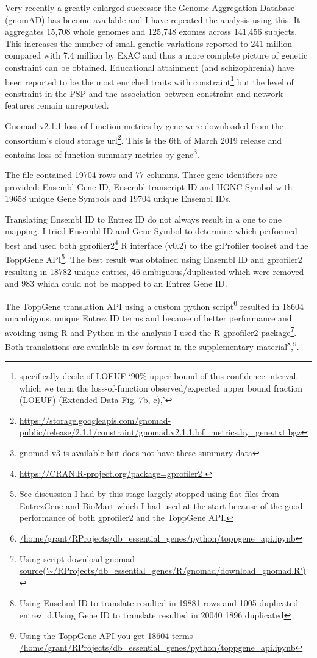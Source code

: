 Very recently a greatly enlarged successor the Genome Aggregation Database (gnomAD) has become available and I have repeated the analysis using this. It aggregates 15,708 whole genomes and 125,748 exomes across 141,456 subjects. This increases the number of small genetic variations reported to 241 million compared with 7.4 million by ExAC and thus a more complete picture of genetic constraint can be obtained\cite{karczewski2020mutational}. Educational attainment (and schizophrenia) have been reported to be the most enriched traits with constraint\cite{karczewski2020mutational}\footnote{specifically decile of LOEUF `90\% upper bound of this confidence interval, which we term the loss-of-function observed/expected upper bound fraction (LOEUF) (Extended Data Fig. 7b, c),\cite{karczewski2020mutational}'} but the level of constraint in the PSP and the association between constraint and network features remain unreported.  

Gnomad v2.1.1 loss of function metrics by gene were downloaded from the consortium's cloud storage url\footnote{\url{https://storage.googleapis.com/gnomad-public/release/2.1.1/constraint/gnomad.v2.1.1.lof_metrics.by_gene.txt.bgz}}. This is the 6th of March 2019 release and contains loss of function summary metrics by gene\footnote{gnomad v3 is available but does not have these summary data}.

The file contained 19704 rows and 77 columns. Three gene identifiers are provided: Ensembl Gene ID, Ensembl transcript ID and HGNC Symbol with 19658 unique Gene Symbols and 19704 unique Ensembl IDs.

Translating Ensembl ID to Entrez ID do not always result in a one to one mapping. I tried Ensembl ID and Gene Symbol to determine which performed best and used both gprofiler2\footnote{\url{https://CRAN.R-project.org/package=gprofiler2 }} R interface (v0.2) to the g:Profiler toolset\cite{raudvere2019g} and the ToppGene API\footnote{See discussion I had by this stage largely stopped using flat files from EntrezGene and BioMart which I had used at the start because of the good performance of both gprofiler2 and the ToppGene API.}. The best result was obtained using Ensembl ID and gprofiler2 resulting in 18782 unique entries, 46 ambiguous/duplicated which were removed and 983 which could not be mapped to an Entrez Gene ID. 

The ToppGene translation API using a custom python script\footnote{\url{/home/grant/RProjects/db_essential_genes/python/toppgene_api.ipynb}} resulted in 18604 unambigous, unique Entrez ID terms and because of better performance and avoiding using R and Python in the analysis I used the R gprofiler2 package\footnote{Using script download gnomad \url{source('~/RProjects/db_essential_genes/R/gnomad/download_gnomad.R')}}.  Both translations are available in csv format in the supplementary material\footnote{Using Ensebml ID to translate resulted in 19881 rows and 1005 duplicated entrez id.Using Gene ID to translate resulted in 20040 1896 duplicated},\footnote{Using the ToppGene API you get 18604 terms \url{/home/grant/RProjects/db_essential_genes/python/toppgene_api.ipynb}}.

